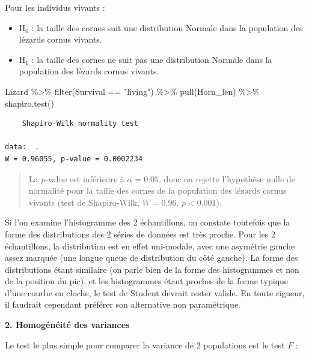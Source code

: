 \documentclass[
  a4paper,
]{article}
\newenvironment{Shaded}{\begin{snugshade}}{\end{snugshade}}
\newcommand{\FunctionTok}[1]{\textcolor[rgb]{0.39,0.29,0.61}{#1}}
\newcommand{\NormalTok}[1]{\textcolor[rgb]{0.12,0.11,0.11}{#1}}
\newcommand{\SpecialCharTok}[1]{\textcolor[rgb]{0.24,0.68,0.91}{#1}}
\newcommand{\StringTok}[1]{\textcolor[rgb]{0.75,0.01,0.01}{#1}}
\providecommand{\tightlist}{%
  \setlength{\itemsep}{0pt}\setlength{\parskip}{0pt}}
\begin{document}
Pour les individus vivants :

\begin{itemize}
\tightlist
\item
  H\(_0\) : la taille des cornes suit une distribution Normale dans la population des lézards cornus vivants.
\item
  H\(_1\) : la taille des cornes ne suit pas une distribution Normale dans la population des lézards cornus vivants.
\end{itemize}

\begin{Shaded}
\begin{Highlighting}[]
\NormalTok{Lizard }\SpecialCharTok{\%\textgreater{}\%} 
  \FunctionTok{filter}\NormalTok{(Survival }\SpecialCharTok{==} \StringTok{"living"}\NormalTok{) }\SpecialCharTok{\%\textgreater{}\%} 
  \FunctionTok{pull}\NormalTok{(Horn\_len) }\SpecialCharTok{\%\textgreater{}\%} 
  \FunctionTok{shapiro.test}\NormalTok{()}
\end{Highlighting}
\end{Shaded}

\begin{verbatim}
    Shapiro-Wilk normality test

data:  .
W = 0.96055, p-value = 0.0002234
\end{verbatim}

\begin{quote}
La \(p\)-value est inférieure à \(\alpha = 0.05\), donc on rejette l'hypothèse nulle de normalité pour la taille des cornes de la population des lézards cornus vivants (test de Shapiro-Wilk, \(W = 0.96\), \(p < 0.001\)).
\end{quote}

Si l'on examine l'histogramme des 2 échantillons, on constate toutefois que la forme des distributions des 2 séries de données est très proche. Pour les 2 échantillons, la distribution est en effet uni-modale, avec une asymétrie gauche assez marquée (une longue queue de distribution du côté gauche). La forme des distributions étant similaire (on parle bien de la forme des histogrammes et non de la position du pic), et les histogrammes étant proches de la forme typique d'une courbe en cloche, le test de Student devrait rester valide. En toute rigueur, il faudrait cependant préférer son alternative non paramétrique.

\textbf{2. Homogénéité des variances}

Le test le plus simple pour comparer la variance de 2 populations est le test \(F\) :
\end{document}
